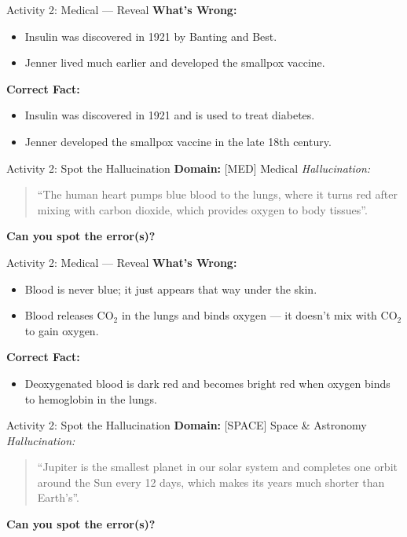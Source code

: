 \documentclass{beamer}
\begin{document}
\begin{frame}{Activity 2: Medical — Reveal}
    	\textbf{What’s Wrong:}
    \begin{itemize}
        \item Insulin was discovered in 1921 by Banting and Best.
        \item Jenner lived much earlier and developed the smallpox vaccine.
    \end{itemize}
    	\textbf{Correct Fact:}
    \begin{itemize}
        \item Insulin was discovered in 1921 and is used to treat diabetes.
        \item Jenner developed the smallpox vaccine in the late 18th century.
    \end{itemize}
\end{frame}

\begin{frame}{Activity 2: Spot the Hallucination}
    	\textbf{Domain:} [MED] Medical
    \vspace{0.3cm}
    	\textit{Hallucination:}
    \begin{quote}
        ``The human heart pumps blue blood to the lungs, where it turns red after mixing with carbon dioxide, which provides oxygen to body tissues''.
    \end{quote}
    \vspace{0.3cm}
    	\textbf{Can you spot the error(s)?}
\end{frame}

\begin{frame}{Activity 2: Medical — Reveal}
    	\textbf{What’s Wrong:}
    \begin{itemize}
        \item Blood is never blue; it just appears that way under the skin.
        \item Blood releases CO$_2$ in the lungs and binds oxygen — it doesn’t mix with CO$_2$ to gain oxygen.
    \end{itemize}
    	\textbf{Correct Fact:}
    \begin{itemize}
        \item Deoxygenated blood is dark red and becomes bright red when oxygen binds to hemoglobin in the lungs.
    \end{itemize}
\end{frame}

\begin{frame}{Activity 2: Spot the Hallucination}
    	\textbf{Domain:} [SPACE] Space \& Astronomy
    \vspace{0.3cm}
    	\textit{Hallucination:}
    \begin{quote}
        ``Jupiter is the smallest planet in our solar system and completes one orbit around the Sun every 12 days, which makes its years much shorter than Earth’s''.
    \end{quote}
    \vspace{0.3cm}
    	\textbf{Can you spot the error(s)?}
\end{frame}
\end{document}
